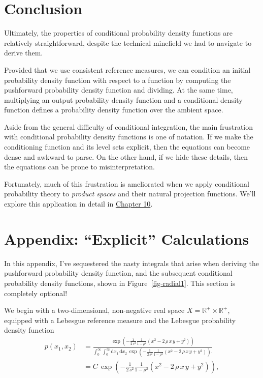 \documentclass[
  letterpaper,
  DIV=11,
  numbers=noendperiod]{scrartcl}
\begin{document}
\section{Conclusion}\label{conclusion}

Ultimately, the properties of conditional probability density functions
are relatively straightforward, despite the technical minefield we had
to navigate to derive them.

Provided that we use consistent reference measures, we can condition an
initial probability density function with respect to a function by
computing the pushforward probability density function and dividing. At
the same time, multiplying an output probability density function and a
conditional density function defines a probability density function over
the ambient space.

Aside from the general difficulty of conditional integration, the main
frustration with conditional probability density functions is one of
notation. If we make the conditioning function and its level sets
explicit, then the equations can become dense and awkward to parse. On
the other hand, if we hide these details, then the equations can be
prone to misinterpretation.

Fortunately, much of this frustration is ameliorated when we apply
conditional probability theory to \emph{product spaces} and their
natural projection functions. We'll explore this application in detail
in
\href{http://www.symplectomorphic.com/assets/chapters_html/probability_theory_on_product_spaces.html}{Chapter
10}.

\section*{Appendix: ``Explicit'' Calculations}\label{sec:appendix}

In this appendix, I've sequestered the nasty integrals that arise when
deriving the pushforward probability density function, and the
subsequent conditional probability density functions, shown in
Figure~\ref{fig-radial1}. This section is completely optional!

We begin with a two-dimensional, non-negative real space
\(X = \mathbb{R}^{+} \times \mathbb{R}^{+}\), equipped with a Lebesgue
reference measure and the Lebesgue probability density function
\begin{align*}
p(x_{1}, x_{2})
&=
\frac{
\exp \left( - \frac{1}{2 \, s^{2}} \frac{1}{1 - \rho^{2}}
              ( x^{2} - 2 \, \rho \, x \, y + y^{2} ) \right)
}{
\int_{0}^{\infty} \int_{0}^{\infty}
\mathrm{d} x_{1} \, \mathrm{d} x_{2} \,
\exp \left( - \frac{1}{2 \, s^{2}} \frac{1}{1 - \rho^{2}}
             ( x^{2} - 2 \, \rho \, x \, y + y^{2} ) \right).
}
\\
&=
C \,
\exp \left(
  - \frac{1}{2 \, s^{2}} \frac{1}{1 - \rho^{2}}
    ( x^{2} - 2 \, \rho \, x \, y + y^{2} )
\right),
\end{align*}
\end{document}
